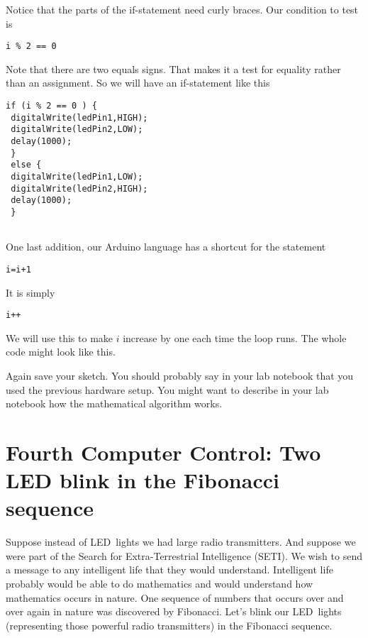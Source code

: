 Notice that the parts of the if-statement need curly braces. Our condition
to test is
 \begin{lstlisting}[language=Arduino]
i % 2 == 0
 \end{lstlisting}

Note that there are two equals signs. That makes it a test for equality
rather than an assignment. So we will have an if-statement like this
 \begin{lstlisting}[language=Arduino]
if (i % 2 == 0 ) {
 digitalWrite(ledPin1,HIGH);
 digitalWrite(ledPin2,LOW);
 delay(1000);
 }
 else {
 digitalWrite(ledPin1,LOW);
 digitalWrite(ledPin2,HIGH);
 delay(1000);
 }
 
 \end{lstlisting}

One last addition, our Arduino language has a shortcut for the statement
 \begin{lstlisting}[language=Arduino]
i=i+1
 \end{lstlisting}

It is simply
 \begin{lstlisting}[language=Arduino]
i++
 \end{lstlisting}

We will use this to make $i$ increase by one each time the loop runs. The
whole code might look like this.




Again save your sketch. You should probably say in your lab notebook that
you used the previous hardware setup. You might want to describe in your lab
notebook how the mathematical algorithm works.

\section{Fourth Computer Control: Two LED blink in the Fibonacci sequence}

Suppose instead of LED\ lights we had large radio transmitters. And suppose
we were part of the Search for Extra-Terrestrial Intelligence (SETI). We
wish to send a message to any intelligent life that they would understand.
Intelligent life probably would be able to do mathematics and would
understand how mathematics occurs in nature. One sequence of numbers that
occurs over and over again in nature was discovered by Fibonacci. Let's
blink our LED\ lights (representing those powerful radio transmitters) in
the Fibonacci sequence.

